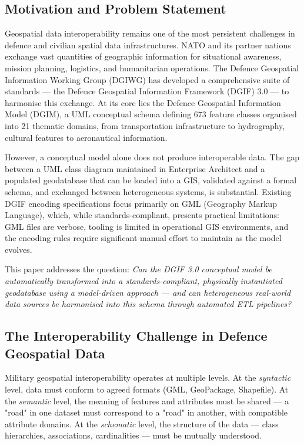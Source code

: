 \documentclass[conference]{IEEEtran}
\begin{document}
\subsection{Motivation and Problem Statement}

Geospatial data interoperability remains one of the most persistent challenges in defence and civilian spatial data infrastructures. NATO and its partner nations exchange vast quantities of geographic information for situational awareness, mission planning, logistics, and humanitarian operations. The Defence Geospatial Information Working Group (DGIWG) has developed a comprehensive suite of standards — the Defence Geospatial Information Framework (DGIF) 3.0 — to harmonise this exchange. At its core lies the Defence Geospatial Information Model (DGIM), a UML conceptual schema defining 673 feature classes organised into 21 thematic domains, from transportation infrastructure to hydrography, cultural features to aeronautical information.

However, a conceptual model alone does not produce interoperable data. The gap between a UML class diagram maintained in Enterprise Architect and a populated geodatabase that can be loaded into a GIS, validated against a formal schema, and exchanged between heterogeneous systems, is substantial. Existing DGIF encoding specifications focus primarily on GML (Geography Markup Language), which, while standards-compliant, presents practical limitations: GML files are verbose, tooling is limited in operational GIS environments, and the encoding rules require significant manual effort to maintain as the model evolves.

This paper addresses the question: \textit{Can the DGIF 3.0 conceptual model be automatically transformed into a standards-compliant, physically instantiated geodatabase using a model-driven approach — and can heterogeneous real-world data sources be harmonised into this schema through automated ETL pipelines?}

\subsection{The Interoperability Challenge in Defence Geospatial Data}

Military geospatial interoperability operates at multiple levels. At the \textit{syntactic} level, data must conform to agreed formats (GML, GeoPackage, Shapefile). At the \textit{semantic} level, the meaning of features and attributes must be shared — a "road" in one dataset must correspond to a "road" in another, with compatible attribute domains. At the \textit{schematic} level, the structure of the data — class hierarchies, associations, cardinalities — must be mutually understood.
\end{document}
